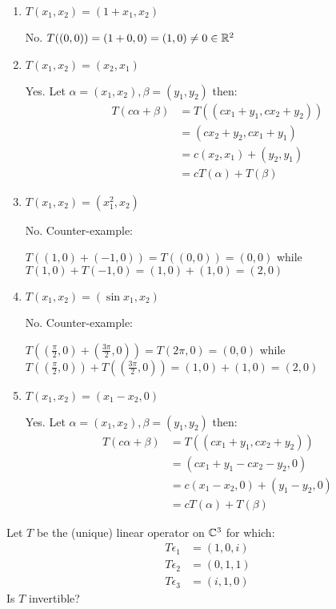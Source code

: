 \documentclass[a4paper, 10pt]{article}
\begin{document}
\begin{solution}
    \begin{enumerate} [label=(\alph*)]
        \item \(T(x_1, x_2) = (1 + x_1, x_2)\)

        No. \(T((0, 0)) = (1 + 0, 0) = (1, 0) \neq 0 \in \mathbb{R}^2\)
        \item \(T(x_1, x_2) = (x_2, x_1)\)
        
        Yes. Let \(\alpha = (x_1, x_2), \beta = (y_1, y_2)\) then: 
        \begin{align*}
            T(c\alpha + \beta) &= T((cx_1 + y_1, cx_2 + y_2)) \\
            &= (cx_2 + y_2, cx_1 + y_1) \\
            &= c(x_2, x_1) + (y_2, y_1) \\
            &= cT(\alpha) + T(\beta)
        \end{align*}
        \item \(T(x_1, x_2) = (x_1^2, x_2)\)
        
        No. Counter-example:

        \(T((1,0) + (-1, 0)) = T((0, 0)) = (0, 0)\) while \(T(1,0) + T(-1,0) = (1,0) + (1,0) = (2,0)\)
        \item \(T(x_1, x_2) = (\sin x_1, x_2)\)
        
        No. Counter-example:

        \(T((\frac{\pi}{2}, 0) + (\frac{3\pi}{2}, 0)) = T(2\pi, 0) = (0, 0)\) while \(T((\frac{\pi}{2}, 0)) + T((\frac{3\pi}{2}, 0)) = (1, 0) + (1,0) = (2,0)\)
        \item \(T(x_1, x_2) = (x_1 - x_2, 0)\)
        
        Yes. Let \(\alpha = (x_1, x_2), \beta = (y_1, y_2)\) then: 
        \begin{align*}
            T(c\alpha + \beta) &= T((cx_1 + y_1, cx_2 + y_2)) \\
            &= (cx_1 + y_1 - cx_2 - y_2, 0) \\
            &= c(x_1 - x_2, 0) + (y_1-y_2, 0) \\
            &= cT(\alpha) + T(\beta)
        \end{align*}
    \end{enumerate}
\end{solution}
\begin{problem} 
    Let \(T\) be the (unique) linear operator on \(\mathbb{C}^3\) for which:
    \begin{align*}
        T\epsilon_1 &=(1, 0, i) \\
        T\epsilon_2 &=(0, 1, 1) \\
        T\epsilon_3 &=(i, 1, 0)
    \end{align*}
    Is \(T\) invertible?
\end{problem}
\end{document}
